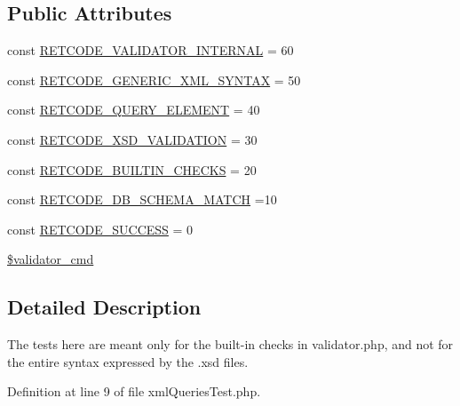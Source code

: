\subsection*{Public Attributes}
\begin{DoxyCompactItemize}
\item 
const \hyperlink{classXmlQueriesTest_af40b291b4313d43528e07d70e0bd9386}{R\+E\+T\+C\+O\+D\+E\+\_\+\+V\+A\+L\+I\+D\+A\+T\+O\+R\+\_\+\+I\+N\+T\+E\+R\+N\+A\+L} = 60
\item 
const \hyperlink{classXmlQueriesTest_afe1c785caafdf0fac8f2083c6f27fa33}{R\+E\+T\+C\+O\+D\+E\+\_\+\+G\+E\+N\+E\+R\+I\+C\+\_\+\+X\+M\+L\+\_\+\+S\+Y\+N\+T\+A\+X} = 50
\item 
const \hyperlink{classXmlQueriesTest_ac8459354cf6e3d123043c568cabd15c4}{R\+E\+T\+C\+O\+D\+E\+\_\+\+Q\+U\+E\+R\+Y\+\_\+\+E\+L\+E\+M\+E\+N\+T} = 40
\item 
const \hyperlink{classXmlQueriesTest_a0e375617451a3fc8ae53ce889d2ee3cf}{R\+E\+T\+C\+O\+D\+E\+\_\+\+X\+S\+D\+\_\+\+V\+A\+L\+I\+D\+A\+T\+I\+O\+N} = 30
\item 
const \hyperlink{classXmlQueriesTest_a3935d6c1b83e08c485cba4e9889f4ad2}{R\+E\+T\+C\+O\+D\+E\+\_\+\+B\+U\+I\+L\+T\+I\+N\+\_\+\+C\+H\+E\+C\+K\+S} = 20
\item 
const \hyperlink{classXmlQueriesTest_a88508d6f9e18d2a8618b4569a26fa3c1}{R\+E\+T\+C\+O\+D\+E\+\_\+\+D\+B\+\_\+\+S\+C\+H\+E\+M\+A\+\_\+\+M\+A\+T\+C\+H} =10
\item 
const \hyperlink{classXmlQueriesTest_aafe3c02f23f57645508a4cd12d47eb41}{R\+E\+T\+C\+O\+D\+E\+\_\+\+S\+U\+C\+C\+E\+S\+S} = 0
\item 
\hyperlink{classXmlQueriesTest_a04e3d36da29d9ab13df995f8e8620cf9}{\$validator\+\_\+cmd}
\end{DoxyCompactItemize}


\subsection{Detailed Description}
The tests here are meant only for the built-\/in checks in validator.\+php, and not for the entire syntax expressed by the .xsd files. 

Definition at line 9 of file xml\+Queries\+Test.\+php.



